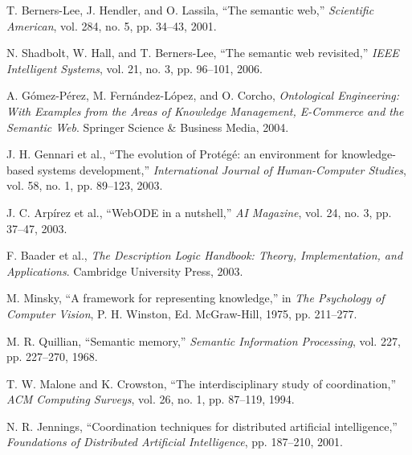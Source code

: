\documentclass[conference]{IEEEtran}
\begin{document}
\begin{thebibliography}{1}

T. Berners-Lee, J. Hendler, and O. Lassila, ``The semantic web,'' \emph{Scientific American}, vol. 284, no. 5, pp. 34--43, 2001.

N. Shadbolt, W. Hall, and T. Berners-Lee, ``The semantic web revisited,'' \emph{IEEE Intelligent Systems}, vol. 21, no. 3, pp. 96--101, 2006.

A. Gómez-Pérez, M. Fernández-López, and O. Corcho, \emph{Ontological Engineering: With Examples from the Areas of Knowledge Management, E-Commerce and the Semantic Web}. Springer Science \& Business Media, 2004.

J. H. Gennari et al., ``The evolution of Protégé: an environment for knowledge-based systems development,'' \emph{International Journal of Human-Computer Studies}, vol. 58, no. 1, pp. 89--123, 2003.

J. C. Arpírez et al., ``WebODE in a nutshell,'' \emph{AI Magazine}, vol. 24, no. 3, pp. 37--47, 2003.

F. Baader et al., \emph{The Description Logic Handbook: Theory, Implementation, and Applications}. Cambridge University Press, 2003.

M. Minsky, ``A framework for representing knowledge,'' in \emph{The Psychology of Computer Vision}, P. H. Winston, Ed. McGraw-Hill, 1975, pp. 211--277.

M. R. Quillian, ``Semantic memory,'' \emph{Semantic Information Processing}, vol. 227, pp. 227--270, 1968.

T. W. Malone and K. Crowston, ``The interdisciplinary study of coordination,'' \emph{ACM Computing Surveys}, vol. 26, no. 1, pp. 87--119, 1994.

N. R. Jennings, ``Coordination techniques for distributed artificial intelligence,'' \emph{Foundations of Distributed Artificial Intelligence}, pp. 187--210, 2001.

\end{thebibliography}
\end{document}
